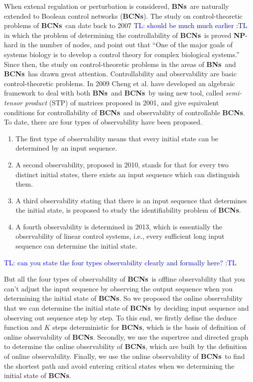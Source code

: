 \documentclass[letterpaper, 10 pt, conference]{ieeeconf}  %
\def \BNs {{\bf BNs}}
\def \BCNs {{\bf BCNs}}
\newcommand{\tl}[1]{\textcolor{blue} {TL: #1 :TL} }
\begin{document}
When extenal regulation or perturbation is considered, \BNs\ are naturally extended to Boolean control networks ({\bf BCNs}). The study on control-theoretic problems of \BCNs\ can date back to 2007 \tl{should be much much earlier} in which the problem of determining the controllability of \BCNs\ is proved {\bf NP}-hard in the number of nodes, and point out that ``One of the major goals of systems biology is to develop a control theory for complex biological systems.'' Since then, the study on control-theoretic problems in the areas of \BNs\ and \BCNs\ has drawn great attention. Controllability and observability are basic control-theoretic problems. In 2009 Cheng et al. have developed an algebraic framework to deal with both \BNs\ and \BCNs\ by using new tool, called \emph{semi-tensor product} (STP) of matrices proposed in 2001, and give equivalent conditions for controllability of \BCNs\ and observability of controllable {\bf BCNs}. To date, there are four types of observability have been proposed. 

\begin{enumerate}
	\item The first type of observability means that every initial state can be determined by an input sequence.
	
	\item 
	A second observability, proposed in 2010, stands for that for every two distinct initial states, there exists an input sequence which can distinguish them.
	
	\item A third observability stating that there is an input sequence that determines the initial state, is proposed to study the identifiability problem of {\bf BCNs}.
	
	\item  A fourth observability is determined in 2013, which is essentially the observability of linear control systems, i.e., every sufficient long input sequence can determine the initial state.
\end{enumerate}
 

\tl{can you state the four types observability clearly and formally here?}

But all the four types of observability of \BCNs\ is offline observability that you can't adjust the input sequence by observing the output sequence when you determining the initial state of {\bf BCNs}. So we proposed the online observability that we can determine the initial state of \BCNs\ by deciding input sequence and observing out sequence step by step. To this end, we firstly define the deduce function and $K$ steps deterministic for {\bf BCNs}, which is the basis of definition of online observability of {\bf BCNs}. Secondly, we use the supertree and directed graph to determine the online observability of {\bf BCNs}, which are built by the definition of online observability. Finally, we use the online observability of \BCNs\ to find the shortest path and avoid entering critical states when we determining the initial state of {\bf BCNs}. 
\end{document}
